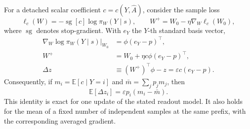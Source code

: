 For a detached scalar coefficient $c=c(Y,\widehat A)$, consider the
sample loss
\begin{equation}
 \ell_c(W)=-\operatorname{sg}[c]\log\pi_W(Y\mid s),
 \qquad W^+=W_0-\eta\nabla_W\ell_c(W_0),
 \label{eq:dyn-generic-loss}
\end{equation}
where $\operatorname{sg}$ denotes stop-gradient. With $e_Y$ the $Y$-th
standard basis vector,
\begin{align}
 \nabla_W\log\pi_W(Y\mid s)\big|_{W_0}
 &=\phi(e_Y-p)^\top, \nonumber\\
 W^+&=W_0+\eta c\phi(e_Y-p)^\top, \nonumber\\
 \Delta z&\equiv (W^+)^\top\phi-z
       =\varepsilon c(e_Y-p).
 \label{eq:dyn-generic-update}
\end{align}
Consequently, if $m_i=\mathbb E[c\mid Y=i]$ and
$\bar m=\sum_jp_jm_j$, then
\begin{equation}
 \mathbb E[\Delta z_i]=\varepsilon p_i(m_i-\bar m).
 \label{eq:dyn-generic-mean}
\end{equation}
This identity is exact for one update of the stated readout model.
It also holds for the mean of a fixed number of independent samples at the
same prefix, with the corresponding averaged gradient.

